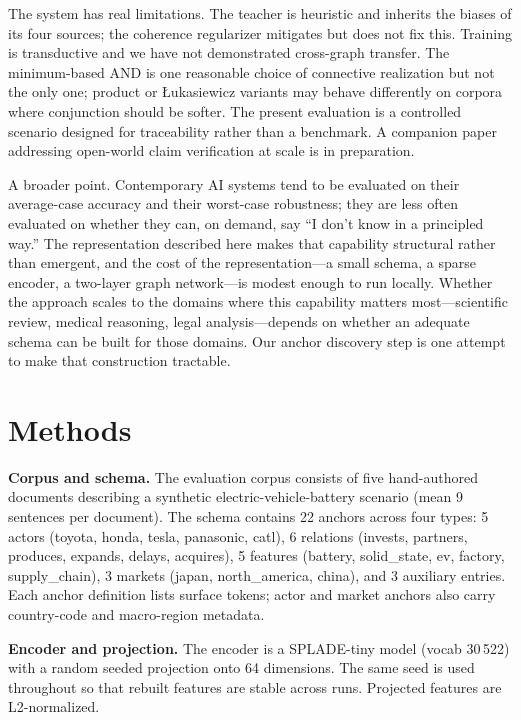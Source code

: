 \documentclass[11pt,a4paper]{article}
\begin{document}
The system has real limitations. The teacher is heuristic and
inherits the biases of its four sources; the coherence
regularizer mitigates but does not fix this. Training is
transductive and we have not demonstrated cross-graph
transfer. The minimum-based AND is one reasonable choice of
connective realization but not the only one; product or
{\L}ukasiewicz variants may behave differently on corpora
where conjunction should be softer. The present evaluation is
a controlled scenario designed for traceability rather than a
benchmark. A companion paper addressing open-world claim
verification at scale is in preparation.

A broader point. Contemporary AI systems tend to be evaluated
on their average-case accuracy and their worst-case
robustness; they are less often evaluated on whether they can,
on demand, say ``I don't know in a principled way.'' The
representation described here makes that capability structural
rather than emergent, and the cost of the representation---a
small schema, a sparse encoder, a two-layer graph
network---is modest enough to run locally. Whether the
approach scales to the domains where this capability matters
most---scientific review, medical reasoning, legal
analysis---depends on whether an adequate schema can be built
for those domains. Our anchor discovery step is one attempt to
make that construction tractable.

\section{Methods}

\textbf{Corpus and schema.} The evaluation corpus consists of
five hand-authored documents describing a synthetic
electric-vehicle-battery scenario (mean 9 sentences per
document). The schema contains 22 anchors across four types:
5 actors (toyota, honda, tesla, panasonic, catl), 6 relations
(invests, partners, produces, expands, delays, acquires), 5
features (battery, solid\_state, ev, factory, supply\_chain),
3 markets (japan, north\_america, china), and 3 auxiliary
entries. Each anchor definition lists surface tokens; actor
and market anchors also carry country-code and macro-region
metadata.

\textbf{Encoder and projection.} The encoder is a SPLADE-tiny
model (vocab 30\,522) with a random seeded projection onto 64
dimensions. The same seed is used throughout so that rebuilt
features are stable across runs. Projected features are
L2-normalized.
\end{document}
